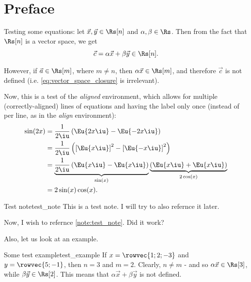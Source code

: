 \section{Preface}

Testing some equations: let $\vec{x},\vec{y}\in\Rs[n]$ and $\alpha,\beta\in\Rs$. Then from the fact that $\Rs[n]$ is a vector space, we get
\begin{equation}
	\vec{c} = \alpha\vec{x} + \beta\vec{y} \in \Rs[n].
	\label{eq:vector_space_closure}
\end{equation}

However, if $\vec{a}\in\Rs[m]$, where $m\neq n$, then $\alpha\vec{x}\in\Rs[m]$, and therefore $\vec{c}$ is not defined (i.e. \autoref{eq:vector_space_closure} is irrelevant).

Now, this is a test of the \textit{aligned} environment, which allows for multiple (correctly-aligned) lines of equations and having the label only once (instead of per line, as in the \textit{align} environment):
\begin{equation}
	\begin{aligned}
		\sin(2x) & = \frac{1}{2\iu}\left(\Eu{2x\iu}-\Eu{-2x\iu}\right)                                                                             \\
		         & = \frac{1}{2\iu}\left(\left[\Eu{x\iu}\right]^{2}-\left[\Eu{-x\iu}\right]^{2}\right)                                             \\
		         & = \underbrace{\frac{1}{2\iu}\left(\Eu{x\iu}-\Eu{x\iu}\right)}_{\sin(x)}\underbrace{\left(\Eu{x\iu}+\Eu{x\iu}\right)}_{2\cos(x)} \\
		         & = 2\sin(x)\cos(x).
	\end{aligned}
	\label{eq:aligned_env}
\end{equation}

\begin{note}{Test note}{test_note}
	This is a test note. I will try to also refernce it later.
\end{note}

Now, I wish to refernce \autoref{note:test_note}. Did it work?

Also, let us look at an example.

\begin{example}{Some test example}{test_example}
	If $x=\rowvec{1;2;-3}$ and $y=\rowvec{5;-1}$, then $n=3$ and $m=2$. Clearly, $n\neq m$ - and so $\alpha\vec{x}\in\Rs[3]$, while $\beta\vec{y}\in\Rs[2]$. This means that $\alpha\vec{x}+\beta\vec{y}$ is not defined.
\end{example}

